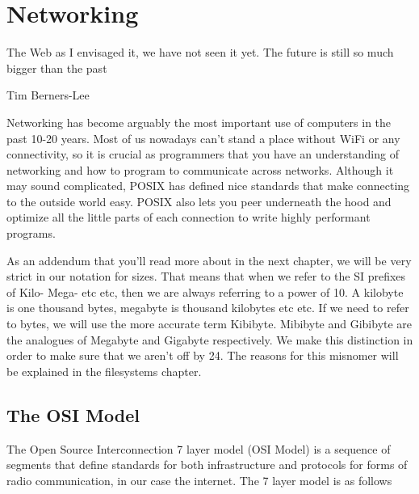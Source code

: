 \chapter{Networking}

\epigraph{The Web as I envisaged it, we have not seen it yet.
  The future is still so much bigger than the past}{Tim Berners-Lee}

Networking has become arguably the most important use of computers in the past 10-20 years.
Most of us nowadays can't stand a place without WiFi or any connectivity, so it is crucial as programmers that you have an understanding of networking and how to program to communicate across networks.
Although it may sound complicated, POSIX has defined nice standards that make connecting to the outside world easy.
POSIX also lets you peer underneath the hood and optimize all the little parts of each connection to write highly performant programs.

As an addendum that you'll read more about in the next chapter, we will be very strict in our notation for sizes.
That means that when we refer to the SI prefixes of Kilo- Mega- etc etc, then we are always referring to a power of 10.
A kilobyte is one thousand bytes, megabyte is thousand kilobytes etc etc.
If we need to refer to  bytes, we will use the more accurate term Kibibyte. Mibibyte and Gibibyte are the analogues of Megabyte and Gigabyte respectively.
We make this distinction in order to make sure that we aren't off by 24.
The reasons for this misnomer will be explained in the filesystems chapter.

\section{The OSI Model}

The Open Source Interconnection 7 layer model (OSI Model) is a sequence of segments that define standards for both infrastructure and protocols for forms of radio communication, in our case the internet.
The 7 layer model is as follows

